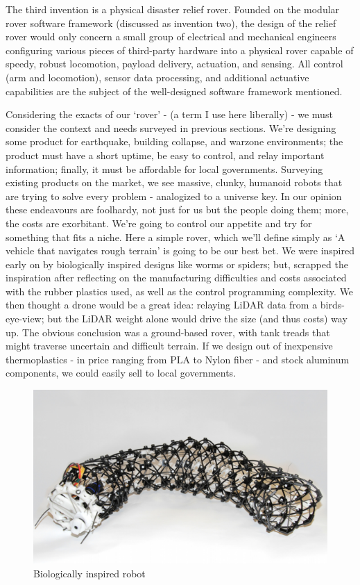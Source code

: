 \documentclass[a4paper, 10pt]{article}
\begin{document}
		The third invention is a physical disaster relief rover. Founded on the modular rover software framework (discussed as invention two), the design of the relief rover would only concern a small group of electrical and mechanical engineers configuring various pieces of third-party hardware into a physical rover capable of speedy, robust locomotion, payload delivery, actuation, and sensing. All control (arm and locomotion), sensor data processing, and additional actuative capabilities are the subject of the well-designed software framework mentioned.

		Considering the exacts of our `rover' - (a term I use here liberally) - we must consider the context and needs surveyed in previous sections. We're designing some product for earthquake, building collapse, and warzone environments; the product must have a short uptime, be easy to control, and relay important information; finally, it must be affordable for local governments. Surveying existing products on the market, we see massive, clunky, humanoid robots that are trying to solve every problem - analogized to a universe key. In our opinion these endeavours are foolhardy, not just for us but the people doing them; more, the costs are exorbitant. We're going to control our appetite and try for something that fits a niche. Here a simple rover, which we'll define simply as `A vehicle that navigates rough terrain' is going to be our best bet. We were inspired early on by biologically inspired designs like worms or spiders; but, scrapped the inspiration after reflecting on the manufacturing difficulties and costs associated with the rubber plastics used, as well as the control programming complexity. We then thought a drone would be a great idea: relaying LiDAR data from a birds-eye-view; but the LiDAR weight alone would drive the size (and thus costs) way up. The obvious conclusion was a ground-based rover, with tank treads that might traverse uncertain and difficult terrain. If we design out of inexpensive thermoplastics - in price ranging from PLA to Nylon fiber - and stock aluminum components, we could easily sell to local governments.
		
		\begin{figure} [!h]
			\centering
			\includegraphics[scale=0.5]{Photos/worm_bot}
			\caption{Biologically inspired robot}
			\label{worm_bot}
		\end{figure}
\end{document}
